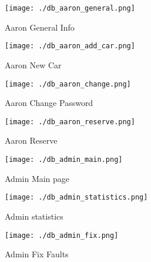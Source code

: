 \documentclass[manuscript,screen,review]{acmart}
\newcommand{\en}[1]{\foreignlanguage{english}{#1}}
\begin{document}
\begin{figure}[H]
    \centering
    \texttt{[image: ./db\_aaron\_general.png]}
    \caption{\en{Aaron General Info }}
\end{figure}

\begin{figure}[H]
    \centering
    \texttt{[image: ./db\_aaron\_add\_car.png]}
    \caption{\en{Aaron New Car }}
\end{figure}

\begin{figure}[H]
    \centering
    \texttt{[image: ./db\_aaron\_change.png]}
    \caption{\en{Aaron Change Password }}
\end{figure}

\begin{figure}[H]
    \centering
    \texttt{[image: ./db\_aaron\_reserve.png]}
    \caption{\en{Aaron Reserve }}
\end{figure}

\newpage

\begin{figure}[H]
    \centering
    \texttt{[image: ./db\_admin\_main.png]}
    \caption{\en{Admin Main page }}
\end{figure}


\begin{figure}[H]
    \centering
    \texttt{[image: ./db\_admin\_statistics.png]}
    \caption{\en{Admin statistics }}
\end{figure}


\begin{figure}[H]
    \centering
    \texttt{[image: ./db\_admin\_fix.png]}
    \caption{\en{Admin Fix Faults }}
\end{figure}
\end{document}

